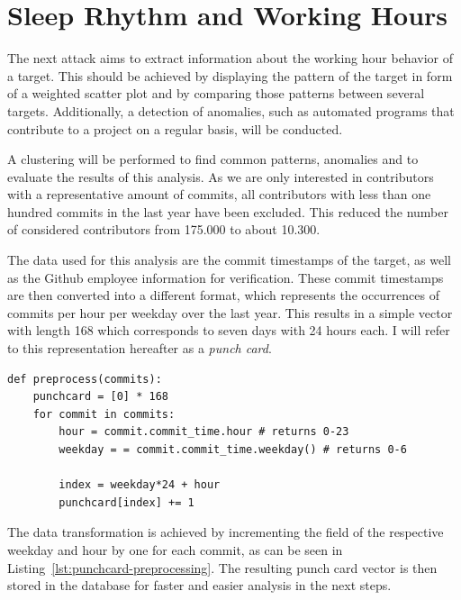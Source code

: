 \section{Sleep Rhythm and Working Hours}\label{punchcard-implementation}

The next attack aims to extract information about the working hour behavior of a target.
This should be achieved by displaying the pattern of the target in form of a weighted scatter plot and by comparing those patterns between several targets.
Additionally, a detection of anomalies, such as automated programs that contribute to a project on a regular basis, will be conducted.

A clustering will be performed to find common patterns, anomalies and to evaluate the results of this analysis.
As we are only interested in contributors with a representative amount of commits, all contributors with less than one hundred commits in the last year have been excluded.
This reduced the number of considered contributors from 175.000 to about 10.300.

The data used for this analysis are the commit timestamps of the target, as well as the Github employee information for verification.
These commit timestamps are then converted into a different format, which represents the occurrences of commits per hour per weekday over the last year.
This results in a simple vector with length 168 which corresponds to seven days with 24 hours each.
I will refer to this representation hereafter as a \emph{punch card}.

\begin{verbatim}
def preprocess(commits):
    punchcard = [0] * 168
    for commit in commits:
        hour = commit.commit_time.hour # returns 0-23
        weekday = = commit.commit_time.weekday() # returns 0-6

        index = weekday*24 + hour
        punchcard[index] += 1

\end{verbatim}
\begingroup
{}\label{lst:puchcard-preprocessing}
\endgroup

The data transformation is achieved by incrementing the field of the respective weekday and hour by one for each commit, as can be seen in Listing~\ref{lst:punchcard-preprocessing}.
The resulting punch card vector is then stored in the database for faster and easier analysis in the next steps.

